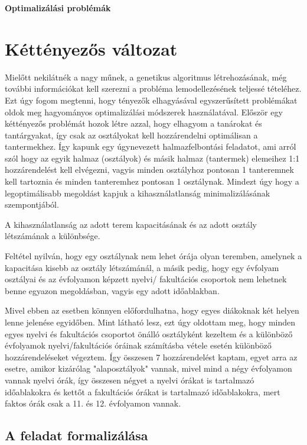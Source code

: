 \documentclass[a4paper,12pt]{article}
\begin{document}
\begin{center}
    \huge \textbf{Optimalizálási problémák} 
\end{center}

\section{Kéttényezős változat}

Mielőtt nekilátnék a nagy műnek, a genetikus algoritmus létrehozásának, még további
információkat kell szerezni a probléma lemodellezésének teljessé tételéhez. Ezt úgy fogom
megtenni, hogy tényezők elhagyásával egyszerűsített problémákat oldok meg hagyományos
optimalizálási módszerek használatával. Először egy kéttényezős problémát hozok létre azzal,
hogy elhagyom a tanárokat és tantárgyakat, így csak az osztályokat kell hozzárendelni
optimálisan a tantermekhez. Így kapunk egy úgynevezett halmazfelbontási feladatot, ami arról
szól hogy az egyik halmaz (osztályok) és másik halmaz (tantermek) elemeihez 1:1
hozzárendelést kell elvégezni, vagyis minden osztályhoz pontosan 1 tanteremnek kell tartoznia
és minden tanteremhez pontosan 1 osztálynak.
Mindezt úgy hogy a legoptimálisabb megoldást
kapjuk a kihasználatlanság minimalizálásának szempontjából.

A kihasználatlanság az adott
terem kapacitásának és az adott osztály létszámának a különbsége.

Feltétel nyilván, hogy egy
osztálynak nem lehet órája olyan teremben, amelynek a kapacitása kisebb az osztály
létszámánál, a másik pedig, hogy egy évfolyam osztályai és az évfolyamon képzett nyelvi/
fakultációs csoportok nem lehetnek benne egyazon megoldásban, vagyis egy adott időablakban.

Mivel ebben az esetben könnyen előfordulhatna, hogy egyes diákoknak két helyen lenne jelenése
egyidőben. Mint látható lesz, ezt úgy oldottam meg, hogy minden egyes nyelvi és fakultációs
csoportot önálló osztályként kezeltem és a különböző évfolyamok nyelvi/fakultációs óráinak
számításba vétele esetén különböző hozzárendeléseket végeztem. Így összesen 7 hozzárendelést
kaptam, egyet arra az esetre, amikor kizárólag "alaposztályok" vannak, mivel mind a négy
évfolyamon vannak nyelvi órák, így összesen négyet a nyelvi órákat is tartalmazó
időablakokra és kettőt a fakultációs órákat is tartalmazó időablakokra, mert faktos órák
csak a 11. és 12. évfolyamon vannak. 

\subsection{A feladat formalizálása}
\end{document}
